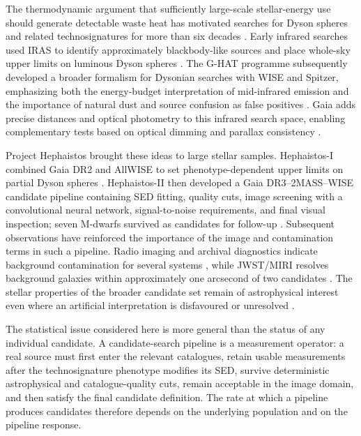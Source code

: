 \documentclass[fleqn,usenatbib]{mnras}
\begin{document}
The thermodynamic argument that sufficiently large-scale stellar-energy use should generate detectable waste heat has motivated searches for Dyson spheres and related technosignatures for more than six decades \citep{Dyson1960}. Early infrared searches used IRAS to identify approximately blackbody-like sources and place whole-sky upper limits on luminous Dyson spheres \citep{Carrigan2009}. The G-HAT programme subsequently developed a broader formalism for Dysonian searches with WISE and Spitzer, emphasizing both the energy-budget interpretation of mid-infrared emission and the importance of natural dust and source confusion as false positives \citep{Wright2014a,Wright2014b,Griffith2015}. Gaia adds precise distances and optical photometry to this infrared search space, enabling complementary tests based on optical dimming and parallax consistency \citep{Zackrisson2018}.

Project Hephaistos brought these ideas to large stellar samples. Hephaistos-I combined Gaia DR2 and AllWISE to set phenotype-dependent upper limits on partial Dyson spheres \citep{Suazo2022}. Hephaistos-II then developed a Gaia DR3--2MASS--WISE candidate pipeline containing SED fitting, quality cuts, image screening with a convolutional neural network, signal-to-noise requirements, and final visual inspection; seven M-dwarfs survived as candidates for follow-up \citep{Suazo2024}. Subsequent observations have reinforced the importance of the image and contamination terms in such a pipeline. Radio imaging and archival diagnostics indicate background contamination for several systems \citep{Ren2024RNAAS,Ren2025,Ren2026}, while JWST/MIRI resolves background galaxies within approximately one arcsecond of two candidates \citep{Zackrisson2026}. The stellar properties of the broader candidate set remain of astrophysical interest even where an artificial interpretation is disfavoured or unresolved \citep{Korn2026}.

The statistical issue considered here is more general than the status of any individual candidate. A candidate-search pipeline is a measurement operator: a real source must first enter the relevant catalogues, retain usable measurements after the technosignature phenotype modifies its SED, survive deterministic astrophysical and catalogue-quality cuts, remain acceptable in the image domain, and then satisfy the final candidate definition. The rate at which a pipeline produces candidates therefore depends on the underlying population and on the pipeline response.
\end{document}
